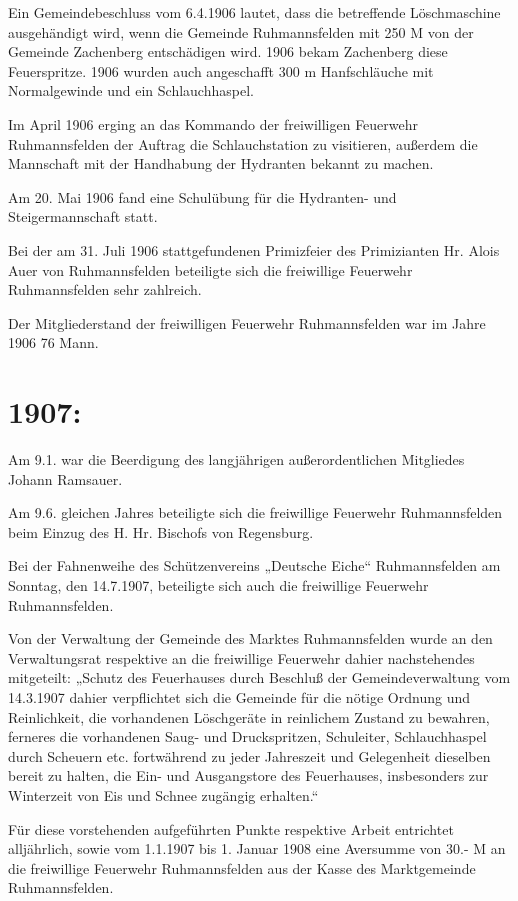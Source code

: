 \documentclass[12pt,a4paper]{book}
\begin{document}
Ein Gemeindebeschluss vom 6.4.1906 lautet, dass die betreffende Löschmaschine
ausgehändigt wird, wenn die Gemeinde Ruhmannsfelden mit 250 M von der Gemeinde
Zachenberg entschädigen wird. 1906 bekam Zachenberg diese Feuerspritze. 1906
wurden auch angeschafft 300 m Hanfschläuche mit Normalgewinde und ein
Schlauchhaspel.

Im April 1906 erging an das Kommando der freiwilligen Feuerwehr Ruhmannsfelden
der Auftrag die Schlauchstation zu visitieren, außerdem die Mannschaft mit der
Handhabung der Hydranten bekannt zu machen.

Am 20. Mai 1906 fand eine Schulübung für die Hydranten- und Steigermannschaft
statt.

Bei der am 31. Juli 1906 stattgefundenen Primizfeier des Primizianten Hr. Alois
Auer von Ruhmannsfelden beteiligte sich die freiwillige Feuerwehr Ruhmannsfelden
sehr zahlreich.

Der Mitgliederstand der freiwilligen Feuerwehr Ruhmannsfelden war im Jahre 1906
76 Mann.

\section{1907:}

Am 9.1. war die Beerdigung des langjährigen außerordentlichen Mitgliedes Johann
Ramsauer.

Am 9.6. gleichen Jahres beteiligte sich die freiwillige Feuerwehr Ruhmannsfelden
beim Einzug des H. Hr. Bischofs von Regensburg.

Bei der Fahnenweihe des Schützenvereins „Deutsche Eiche“ Ruhmannsfelden am
Sonntag, den 14.7.1907, beteiligte sich auch die freiwillige Feuerwehr
Ruhmannsfelden.

Von der Verwaltung der Gemeinde des Marktes Ruhmannsfelden wurde an den
Verwaltungsrat respektive an die freiwillige Feuerwehr dahier nachstehendes
mitgeteilt: „Schutz des Feuerhauses durch Beschluß der Gemeindeverwaltung vom
14.3.1907 dahier verpflichtet sich die Gemeinde für die nötige Ordnung und
Reinlichkeit, die vorhandenen Löschgeräte in reinlichem Zustand zu bewahren,
ferneres die vorhandenen Saug- und Druckspritzen, Schuleiter, Schlauchhaspel
durch Scheuern etc. fortwährend zu jeder Jahreszeit und Gelegenheit dieselben
bereit zu halten, die Ein- und Ausgangstore des Feuerhauses, insbesonders zur
Winterzeit von Eis und Schnee zugängig erhalten.“

Für diese vorstehenden aufgeführten Punkte respektive Arbeit entrichtet
alljährlich, sowie vom 1.1.1907 bis 1. Januar 1908 eine Aversumme von 30.- M an
die freiwillige Feuerwehr Ruhmannsfelden aus der Kasse des Marktgemeinde
Ruhmannsfelden.
\end{document}
